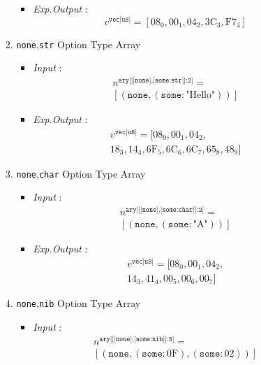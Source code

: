 \documentclass[../alan-handbook.tex]{subfiles}
\begin{document}
\begin{enumerate}
\begin{enumerate}
\begin{enumerate}
\begin{itemize}
                        \item \textit{Exp.Output} : $$v^{\texttt{vec[u8]}} = [\text{08}_0,\text{00}_1,\text{04}_2, \text{3C}_3,\text{F7}_4]$$
                    \end{itemize}
                \item \texttt{none},\texttt{str} Option Type Array
                    \begin{itemize}
                        \item \textit{Input} : $$\begin{matrix}n^{\texttt{ary[[[none],[some:str]]:2]}} = \\ [(\texttt{none},(\texttt{some}:\text{"Hello"}))] \end{matrix}$$
                        \item \textit{Exp.Output} : $$\begin{matrix}v^{\texttt{vec[u8]}} = [\text{08}_0,\text{00}_1,\text{04}_2, \\ \text{18}_3, \text{14}_4,\text{6F}_5,\text{6C}_6,\text{6C}_7,\text{65}_8,\text{48}_9]\end{matrix}$$
                    \end{itemize}
                \item \texttt{none},\texttt{char} Option Type Array
                    \begin{itemize}
                        \item \textit{Input} : $$\begin{matrix}n^{\texttt{ary[[[none],[some:char]]:2]}} = \\ [(\texttt{none},(\texttt{some}:\text{"A"}))]\end{matrix}$$
                        \item \textit{Exp.Output} : $$\begin{matrix}v^{\texttt{vec[u8]}} = [\text{08}_0,\text{00}_1,\text{04}_2,\\ \text{14}_3, \text{41}_4,\text{00}_5,\text{00}_6,\text{00}_7]\end{matrix}$$
                    \end{itemize}
                \item \texttt{none},\texttt{nib} Option Type Array
                    \begin{itemize}
                        \item \textit{Input} : $$\begin{matrix}n^{\texttt{ary[[[none],[some:nib]]:3]}} = \\ [(\texttt{none},(\texttt{some}:\text{0F}),(\texttt{some}:\text{02}))]\end{matrix}$$

\end{itemize}
\end{enumerate}
\end{enumerate}
\end{enumerate}
\end{document}
